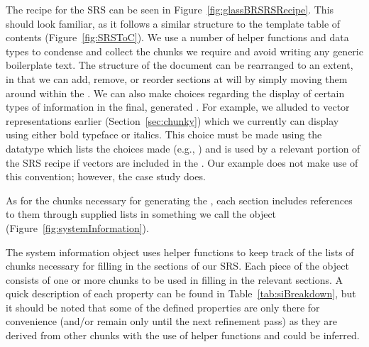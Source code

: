 
The recipe for the \gb{} SRS can be seen in Figure~\ref{fig:glassBRSRSRecipe}.
This should look familiar, as it follows a similar structure to the \smithea{}
template table of contents (Figure~\ref{fig:SRSToC}). We use a number of helper 
functions and data types to condense and collect the chunks we require and 
avoid writing any generic boilerplate text. The structure of the document can 
be rearranged to an extent, in that we can add, remove, or reorder sections at 
will by simply moving them around within the . We can also make 
choices regarding the display of certain types of information in the final, 
generated \sf{}. For example, we alluded to vector representations earlier 
(Section~\ref{sec:chunky}) which we currently can display using either bold 
typeface or italics. This choice must be made using the  
datatype which lists the choices made 
(e.g., ) and is used by a relevant portion of
the SRS recipe if vectors are included in the \sf{}. Our \gb{} example does not 
make use of this convention; however, the \gp{} case study does.

As for the chunks necessary for generating the \sf{}, each section includes 
references to them through supplied lists in something we call the 
object (Figure~\ref{fig:systemInformation}).


The system information object uses helper functions to keep track of the lists 
of chunks necessary for filling in the sections of our SRS. 
Each piece of the object consists of one or more chunks to be 
used in filling in the relevant sections. A quick description of each property 
can be found in Table~\ref{tab:siBreakdown}, but it should be noted that some 
of the defined properties are only there for convenience (and/or remain only 
until the next refinement pass) as they are derived from other chunks with the 
use of helper functions and could be inferred.

